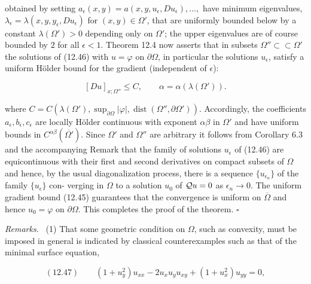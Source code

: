 obtained by setting $a_{\epsilon}(x,y)=a(x,y,u_{\epsilon},D u_{\epsilon}),\dots,$ have minimum eigenvalues,
$\lambda_{\epsilon}=\lambda(x,y,y_{\epsilon},D u_{\epsilon})$ for $(x,y)\in\Omega'$, that are uniformly bounded below by a constant
$\lambda(\Omega')>0$ depending only on $\Omega'$; the upper eigenvalues are of course bounded by
$2$ for all $\epsilon<1$. Theorem 12.4 now asserts that in subsets $\Omega''\subset\subset\Omega'$ the solutions
of (12.46) with $u=\varphi$ on $\partial\Omega$, in particular the solutions $u_{\epsilon}$, satisfy a uniform H\"older
bound for the gradient (independent of $\epsilon$):

\[
[D u]_{x;\Omega''}\leq C,\qquad \alpha=\alpha(\lambda(\Omega')).
\]

where $C=C(\lambda(\Omega'),\sup_{\partial\Omega}|\varphi|,\operatorname{dist}(\Omega'',\partial\Omega'))$. Accordingly, the coefficients $a_{\epsilon}, b_{\epsilon}, c_{\epsilon}$
are locally H\"older continuous with exponent $\alpha\beta$ in $\Omega'$ and have uniform bounds
in $C^{\alpha\beta}(\overline{\Omega'})$. Since $\Omega'$ and $\Omega''$ are arbitrary it follows from Corollary 6.3 and the
accompanying Remark that the family of solutions $u_{\epsilon}$ of (12.46) are equicontinuous
with their first and second derivatives on compact subsets of $\Omega$ and hence, by the
usual diagonalization process, there is a sequence $\{u_{\epsilon_n}\}$ of the family $\{u_{\epsilon}\}$ con-
verging in $\Omega$ to a solution $u_0$ of $\mathcal{Q} u=0$ as $\epsilon_n\to 0$. The uniform gradient bound
(12.45) guarantees that the convergence is uniform on $\overline{\Omega}$ and hence $u_0=\varphi$ on $\partial\Omega$.
This completes the proof of the theorem. $\square$

\textit{Remarks.} \ (1) That some geometric condition on $\Omega$, such as convexity, must be
imposed in general is indicated by classical counterexamples such as that of the
minimal surface equation,

\[
(12.47)\qquad (1+u_y^2)u_{xx}-2u_xu_yu_{xy}+(1+u_x^2)u_{yy}=0,
\]

